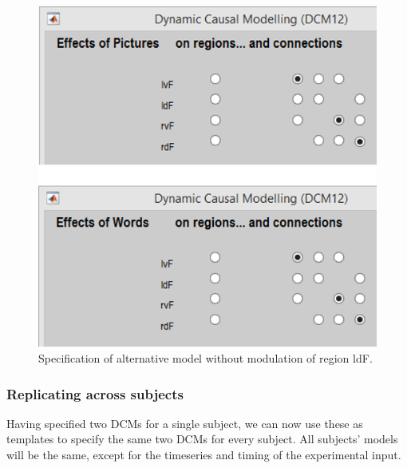 \documentclass{article}
\begin{document}
\begin{figure}[ht]
\begin{center}
\includegraphics{"Fig_dcm_spec_no_ldF"}
\caption{Specification of alternative model without modulation of region ldF.\label{Fig_dcm_spec_no_ldF}}
\end{center}
\end{figure}

\subsubsection{Replicating across subjects} \label{GUI_replicating}

Having specified two DCMs for a single subject, we can now use these as templates to specify the same two DCMs for every subject. All subjects' models will be the same, except for the timeseries and timing of the experimental input.
\end{document}
